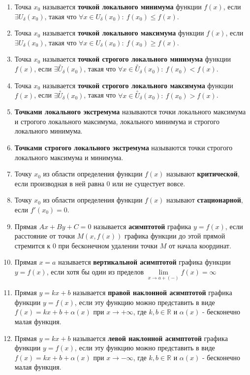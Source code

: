 \begin{enumerate}
\item Точка $x_0$ называется \textbf{точкой локального минимума} функции $f(x)$, если $\exists U_{\delta}(x_0)$, такая что $\forall x \in U_{\delta}(x_0): \ f(x_0) \leqslant f(x)$.
\item Точка $x_0$ называется \textbf{точкой локального максимума} функции $f(x)$, если $\exists U_{\delta}(x_0)$, такая что $\forall x \in U_{\delta}(x_0): \ f(x_0) \geqslant f(x)$.
\item Точка $x_0$ называется \textbf{точкой строгого локального минимума} функции $f(x)$, если $\exists \overset{\circ}{U}_{\delta}(x_0)$, такая что $\forall x \in \overset{\circ}{U}_{\delta}(x_0): \ f(x_0) < f(x)$.
\item Точка $x_0$ называется \textbf{точкой строгого локального максимума} функции $f(x)$, если $\exists \overset{\circ}{U}_\delta(x_0)$, такая что $\forall x \in \overset{\circ}{U}_\delta(x_0): \ f(x_0) > f(x)$.
\item \textbf{Точками локального экстремума} называются точки локального максимума и строгого локального максимума, локального минимума и строгого локального минимума.
\item \textbf{Точками строгого локального экстремума} называются точки строгого локального максимума и минимума.
\item Точку $x_0$ из области определения функции $f(x)$ называют \textbf{критической}, если производная в ней равна 0 или не сущестует вовсе.
\item Точку $x_0$ из области определения функции $f(x)$ называют \textbf{стационарной}, если $f'(x_0) = 0$.
\item Прямая $Ax + By + C = 0$ называется \textbf{асимптотой} графика $y = f(x)$, если расстояние от точки $M(x, f(x))$ графика функции до этой прямой стремится к 0 при бесконечном удалении точки $M$ от начала координат.
\item Прямая $x = a$ называется \textbf{вертикальной асимптотой} графика функции $y = f(x)$, если хотя бы один из пределов $\lim\limits_{x \to a+(-)}f(x) = \infty$
\item Прямая $y = kx + b$ называется \textbf{правой наклонной асимптотой} графика функции $y = f(x)$, если эту функцию можно представить в виде $f(x) = kx + b + \alpha(x)$ при $x \rightarrow +\infty$, где $k, b \in \mathbb{R}$ и $\alpha(x)$ - бесконечно малая функция.
\item Прямая $y = kx + b$ называется \textbf{левой наклонной асимптотой} графика функции $y = f(x)$, если эту функцию можно представить в виде $f(x) = kx + b + \alpha(x)$ при $x \rightarrow -\infty$, где $k, b \in \mathbb{R}$ и $\alpha(x)$ - бесконечно малая функция.

\end{enumerate}
